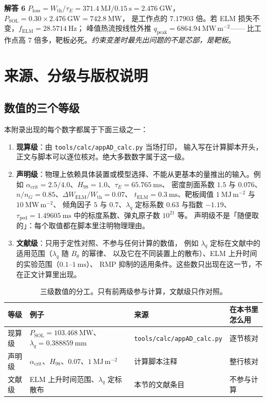 \textbf{解答 6} $P_{\mathrm{loss}}=W_{\mathrm{th}}/\tau_E=371.4\ \mathrm{MJ}/0.15\ \mathrm{s}
=2.476\ \mathrm{GW}$，$P_{\mathrm{SOL}}=0.30\times2.476\ \mathrm{GW}=742.8\ \mathrm{MW}$，
是工作点的 $7.17903$ 倍。若 ELM 损失不变，$f_{\mathrm{ELM}}=28.5714\ \mathrm{Hz}$；
峰值热流按线性外推 $q_{\mathrm{peak}}=6864.94\ \mathrm{MW\,m^{-2}}$——
比工作点高 $7$ 倍多，靶板必死。\emph{约束变差时最先出问题的不是芯部，是靶板}。

\section{来源、分级与版权说明}
\label{sec:app-ad-source}

\begingroup\small
\subsection*{数值的三个等级}

本附录出现的每个数字都属于下面三级之一：

\begin{enumerate}
\item \textbf{现算级}：由 \texttt{tools/\allowbreak{}calc/\allowbreak{}appAD\_calc.py} 当场打印，
输入写在计算脚本开头，正文与脚本可以逐位核对。绝大多数数字属于这一级。
\item \textbf{声明级}：物理上依赖具体装置或模型选择、不能从更基本的量推出的输入。例如 $\alpha_{\mathrm{crit}}=2.5/4.0$、$H_{98}=1.0$、$\tau_E=65.765\ \mathrm{ms}$、
密度剖面系数 $1.5$ 与 $0.076$、$n/n_G=0.85$、$\Delta W_{\mathrm{ELM}}/W_{\mathrm{th}}=0.07$、
$t_{\mathrm{ELM}}=0.3\ \mathrm{ms}$、靶板阈值 $1\ \mathrm{MJ\,m^{-2}}$ 与 $10\ \mathrm{MW\,m^{-2}}$、
倾角因子 $5$ 与 $0.7$、$\lambda_q$ 定标系数 $0.63$ 与指数 $-1.19$、
$\tau_{\mathrm{ped}}=1.49605\ \mathrm{ms}$ 中的标度系数、弹丸原子数 $10^{21}$ 等。
声明级不是「随便取的」：每个取值都在脚本里注明物理理由。
\item \textbf{文献级}：只用于定性对照、不参与任何计算的数值，
例如 $\lambda_q$ 定标在文献中的适用范围（$\lambda_q$ 随 $B_\theta$ 的幂律、
以及它在不同装置上的散布）、ELM 上升时间的实验范围（$0.1$–$1\ \mathrm{ms}$）、
RMP 抑制的适用条件。这些数只出现在这一节，不在正文计算里出现。
\end{enumerate}

\begin{table}[htbp]
\centering
\small
\caption{三级数值的分工。只有前两级参与计算，文献级只作对照。}
\label{tab:app-ad-source}
\begin{tabular}{p{2.6cm}p{3.5cm}p{4.2cm}p{4.6cm}}
\toprule
等级 & 例子 & 来源 & 在本书里怎么用 \\
\midrule
现算级 & $P_{\mathrm{SOL}}=103.468\ \mathrm{MW}$、$\lambda_q=0.388859\ \mathrm{mm}$ & \texttt{tools/\allowbreak{}calc/\allowbreak{}appAD\_calc.py} & 逐节核对 \\
声明级 & $\alpha_{\mathrm{crit}}$、$H_{98}$、$0.07$、$1\ \mathrm{MJ\,m^{-2}}$ & 计算脚本注释 & 整行核对 \\
文献级 & ELM 上升时间范围、$\lambda_q$ 定标散布 & 本节的文献条目 & 不参与计算 \\
\bottomrule
\end{tabular}

\end{table}


